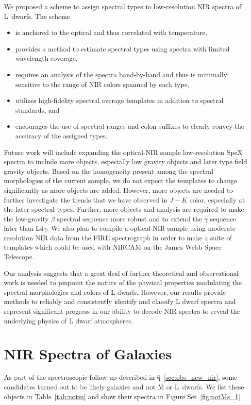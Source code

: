 \documentclass[12pt]{aastex6}
\begin{document}
We proposed a scheme to assign spectral types to low-resolution NIR spectra of L~dwarfs.
The scheme
\begin{itemize}
\item is anchored to the optical and thus correlated with temperature,
\item provides a method to estimate spectral types using spectra with limited wavelength coverage,
\item requires an analysis of the spectra band-by-band and thus is minimally sensitive to the range of NIR colors spanned by each type,
\item utilizes high-fidelity spectral average templates in addition to spectral standards, and
\item encourages the use of spectral ranges and colon suffixes to clearly convey the accuracy of the assigned types.
\end{itemize}

Future work will include expanding the optical-NIR sample low-resolution SpeX spectra to include more objects, especially low gravity objects and later type field gravity objects.
Based on the homogeneity present among the spectral morphologies of the current sample, we do not expect the templates to change significantly as more objects are added.
However, more objects are needed to further investigate the trends that we have observed in $J-K$ color, especially at the later spectral types.
Further, more objects and analysis are required to make the low-gravity $\beta$ spectral sequence more robust and to extend the $\gamma$ sequence later than L4$\gamma$.
We also plan to compile a optical-NIR sample using moderate-resolution NIR data from the FIRE spectrograph in order to make a suite of templates which could be used with NIRCAM on the James Webb Space Telescope.

Our analysis suggests that a great deal of further theoretical and observational work is needed to pinpoint the nature of the physical properties modulating the spectral morphologies and colors of L dwarfs.
However, our results provide methods to reliably and consistently identify and classify L dwarf spectra and represent significant progress in our ability to decode NIR spectra to reveal the underlying physics of L dwarf atmospheres.

\appendix
\section{NIR Spectra of Galaxies}
\label{sec:galaxies}
As part of the spectroscopic follow-up described in \S~\ref{sec:obs_new_nir}, some candidates turned out to be likely galaxies and not M or L~dwarfs. We list these objects in Table~\ref{tab:notm} and show their spectra in Figure Set~\ref{fig:notMs_1}.
\end{document}
